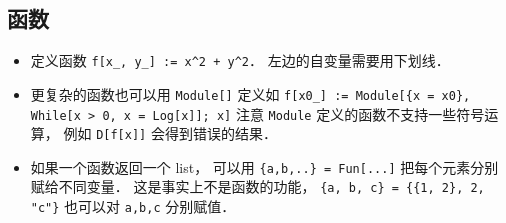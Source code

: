 \subsection{函数}
\begin{itemize}
\item 定义函数 \verb|f[x_, y_] := x^2 + y^2|． 左边的自变量需要用下划线．
\item 更复杂的函数也可以用 \verb|Module[]| 定义如 \verb|f[x0_] := Module[{x = x0}, While[x > 0, x = Log[x]]; x]| 注意 \verb|Module| 定义的函数不支持一些符号运算， 例如 \verb|D[f[x]]| 会得到错误的结果．
\item 如果一个函数返回一个 list， 可以用 \verb|{a,b,..} = Fun[...]| 把每个元素分别赋给不同变量． 这是事实上不是函数的功能， \verb|{a, b, c} = {{1, 2}, 2, "c"}| 也可以对 \verb|a,b,c| 分别赋值．
\end{itemize}

